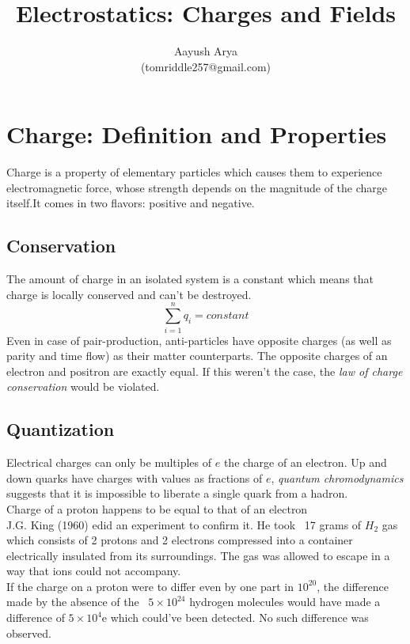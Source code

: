 \documentclass{article}
\title{Electrostatics: Charges and Fields}
\author{Aayush Arya\\ (tomriddle257@gmail.com)}
\begin{document}
	\maketitle
	
	\section*{Charge: Definition and Properties}
	Charge is a property of elementary particles which causes them to experience electromagnetic force, whose strength depends on the magnitude of the charge itself.It comes in two flavors: positive and negative.\\

	\subsection*{Conservation}
	The amount of charge in an isolated system is a constant \textemdash which means that charge is locally conserved and can't be destroyed.
	$$ \sum_{i=1}^{n} q_i = constant$$
	 Even in case of pair-production, anti-particles have opposite charges (as well as parity and time flow) as their matter counterparts. The opposite charges of an electron and positron are exactly equal. If this weren't the case, the \textit{law of charge conservation} would be violated. \\
	
	\subsection*{Quantization}
	
	Electrical charges can only be multiples of $e$ \textemdash the charge of an electron. Up and down quarks have charges with values as fractions of $e$, \textit{quantum chromodynamics} suggests that it is impossible to liberate a single quark from a hadron.\\
	
	Charge of a proton happens to be equal to that of an electron \\ J.G. King (1960) edid an experiment to confirm it. He took ~17 grams of $H_2$ gas \textemdash which consists of 2 protons and 2 electrons \textemdash  compressed into a container electrically insulated from its surroundings. The gas was allowed to escape in a way that ions could not accompany.\\
	If the charge on a proton were to differ even by one part in $10^{20}$, the difference made by the absence of the ~$5\times 10^{24}$ hydrogen molecules would have made a difference of $5\times10^{4}$e which could've been detected. No such difference was observed.
	
\end{document}
